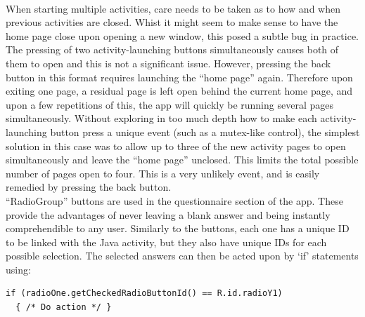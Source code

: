 \\ When starting multiple activities, care needs to be taken as to how and when previous activities are closed. Whist it might seem to make sense to have the home page close upon opening a new window, this posed a subtle bug in practice. The pressing of two activity-launching buttons simultaneously causes both of them to open and this is not a significant issue. However, pressing the back button in this format requires launching the ``home page'' again. Therefore upon exiting one page, a residual page is left open behind the current home page, and upon a few repetitions of this, the app will quickly be running several pages simultaneously. Without exploring in too much depth how to make each activity-launching button press a unique event (such as a mutex-like control), the simplest solution in this case was to allow up to three of the new activity pages to open simultaneously and leave the ``home page'' unclosed. This limits the total possible number of pages open to four. This is a very unlikely event, and is easily remedied by pressing the back button.
\\ ``RadioGroup'' buttons are used in the questionnaire section of the app. These provide the advantages of never leaving a blank answer and being instantly comprehendible to any user. Similarly to the buttons, each one has a unique ID to be linked with the Java activity, but they also have unique IDs for each possible selection. The selected answers can then be acted upon by ‘if’ statements using:
\begin{lstlisting}
if (radioOne.getCheckedRadioButtonId() == R.id.radioY1)
  { /* Do action */ } 
\end{lstlisting}
